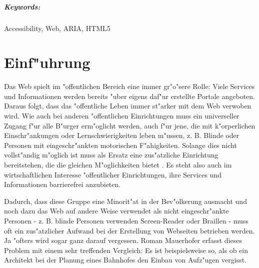 \documentclass[a4paper,bibtotoc,oneside]{scrbook}
\begin{document}
\paragraph*{Keywords:} Accessibility, Web, ARIA, HTML5
\newpage


\tableofcontents\thispagestyle{empty}
\newpage

\setcounter{page}{1}

\chapter{Einf"uhrung}
Das Web spielt im "offentlichen Bereich eine immer gr"o"sere Rolle: Viele
Services und Informationen werden bereits "uber eigens daf"ur erstellte Portale angeboten. Daraus folgt, dass das "offentliche Leben immer st"arker mit dem Web verwoben wird. Wie auch bei anderen "offentlichen Einrichtungen muss ein universeller Zugang f"ur alle B"urger erm"oglicht werden, auch f"ur jene, die mit k"orperlichen Einschr"ankungen oder Lernschwierigkeiten leben m"ussen, z. B. Blinde oder Personen mit eingeschr"ankten motorischen F"ahigkeiten. Solange dies nicht vollst"andig m"oglich ist muss als Ersatz eine zus"atzliche Einrichtung bereitstehen, die die gleichen M"oglichkeiten bietet \cite[S. 8]{understand_acc}. Es steht also auch im wirtschaftlichen Interesse "offentlicher Einrichtungen, ihre Services und Informationen barrierefrei anzubieten. 

Dadurch, dass diese Gruppe eine Minorit"at in der Bev"olkerung ausmacht und noch dazu das Web auf andere Weise verwendet als nicht eingeschr"ankte Personen - z. B. blinde Personen verwenden Screen-Reader oder Braillen - muss oft ein zus"atzlicher Aufwand bei der Erstellung von Webseiten betrieben werden. Ja "ofters wird sogar ganz darauf vergessen.\cite[S. 7]{mod_software} Roman Mauerhofer erfasst dieses Problem mit einem sehr treffenden Vergleich: \glqq Es ist beispielsweise so, als ob ein Architekt bei der Planung eines Bahnhofes den Einbau von Aufz"ugen vergisst.\grqq  \cite[S. 7]{mod_software}
\end{document}
